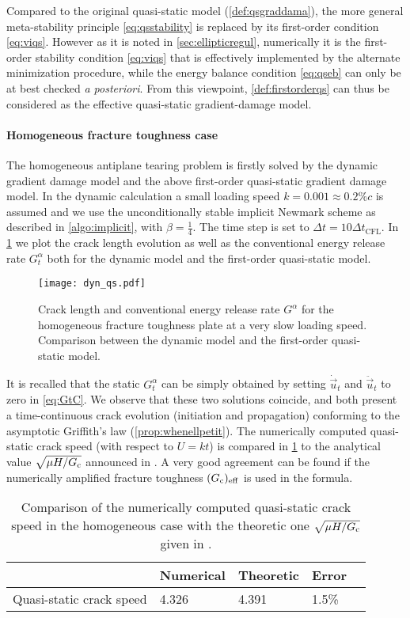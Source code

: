 Compared to the original quasi-static model (\cref{def:qsgraddama}),  the more general meta-stability principle \eqref{eq:qsstability} is replaced by its first-order condition \eqref{eq:viqs}. However as it is noted in \cref{sec:ellipticregul}, numerically it is the first-order stability condition \eqref{eq:viqs} that is effectively implemented by the alternate minimization procedure, while the energy balance condition \eqref{eq:qseb} can only be at best checked \emph{a posteriori}. From this viewpoint, \cref{def:firstorderqs} can thus be considered as the effective quasi-static gradient-damage model.

\paragraph{Homogeneous fracture toughness case} The homogeneous antiplane tearing problem is firstly solved by the dynamic gradient damage model and the above first-order quasi-static gradient damage model. In the dynamic calculation a small loading speed $k=0.001\approx 0.2\%c$ is assumed and we use the unconditionally stable implicit Newmark scheme as described in \cref{algo:implicit}, with $\beta=\frac{1}{4}$. The time step is set to $\Delta t=10\Delta t_\mathrm{CFL}$. In \cref{fig:homoGcqs} we plot the crack length evolution as well as the conventional energy release rate $G^\alpha_t$ both for the dynamic model and the first-order quasi-static model.
\begin{figure}[htbp]
\centering
\texttt{[image: dyn\_qs.pdf]}
\caption{Crack length and conventional energy release rate $G^\alpha$ for the homogeneous fracture toughness plate at a very slow loading speed. Comparison between the dynamic model and the first-order quasi-static model.} \label{fig:homoGcqs}
\end{figure}
It is recalled that the static $G^\alpha_t$ can be simply obtained by setting $\dot{\vec{u}}_t$ and $\ddot{\vec{u}}_t$ to zero in \eqref{eq:GtC}. We observe that these two solutions coincide, and both present a time-continuous crack evolution (initiation and propagation) conforming to the asymptotic Griffith's law (\cref{prop:whenellpetit}). The numerically computed quasi-static crack speed (with respect to $U=kt$) is compared in \cref{tab:compqsv} to the analytical value $\sqrt{\mu H/G_\mathrm{c}}$ announced in \cite{BourdinFrancfortMarigo:2008}. A very good agreement can be found if the numerically amplified fracture toughness $(G_\mathrm{c})_\mathrm{eff}$ is used in the formula.
\begin{table}[htbp]
\centering
\caption{Comparison of the numerically computed quasi-static crack speed in the homogeneous case with the theoretic one $\sqrt{\mu H/G_\mathrm{c}}$ given in \cite{BourdinFrancfortMarigo:2008}.} \label{tab:compqsv}
\begin{tabular}{lllll} \toprule
& Numerical & Theoretic & Error \\ \midrule
Quasi-static crack speed & 4.326 & 4.391 & 1.5\% \\ \bottomrule
\end{tabular}
\end{table}

